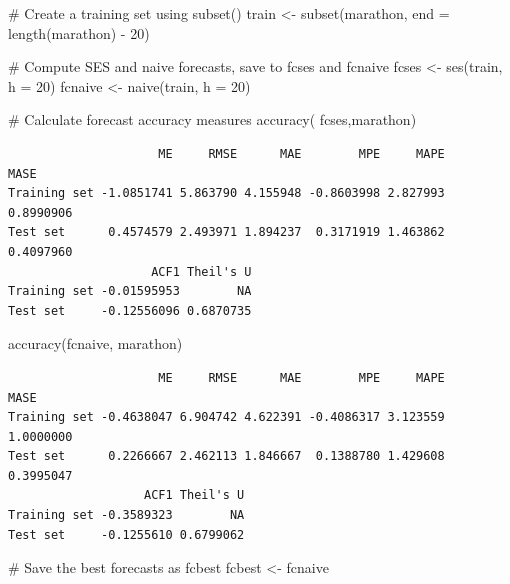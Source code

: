 \documentclass[
  letterpaper,
  DIV=11,
  numbers=noendperiod]{scrartcl}
\newenvironment{Shaded}{\begin{snugshade}}{\end{snugshade}}
\newcommand{\AttributeTok}[1]{\textcolor[rgb]{0.40,0.45,0.13}{#1}}
\newcommand{\CommentTok}[1]{\textcolor[rgb]{0.37,0.37,0.37}{#1}}
\newcommand{\DecValTok}[1]{\textcolor[rgb]{0.68,0.00,0.00}{#1}}
\newcommand{\FunctionTok}[1]{\textcolor[rgb]{0.28,0.35,0.67}{#1}}
\newcommand{\NormalTok}[1]{\textcolor[rgb]{0.00,0.23,0.31}{#1}}
\newcommand{\OtherTok}[1]{\textcolor[rgb]{0.00,0.23,0.31}{#1}}
\newcommand{\SpecialCharTok}[1]{\textcolor[rgb]{0.37,0.37,0.37}{#1}}
\begin{document}
\begin{Shaded}
\begin{Highlighting}[]
\CommentTok{\# Create a training set using subset()}
\NormalTok{train }\OtherTok{\textless{}{-}} \FunctionTok{subset}\NormalTok{(marathon, }\AttributeTok{end =} \FunctionTok{length}\NormalTok{(marathon) }\SpecialCharTok{{-}} \DecValTok{20}\NormalTok{)}

\CommentTok{\# Compute SES and naive forecasts, save to fcses and fcnaive}
\NormalTok{fcses }\OtherTok{\textless{}{-}} \FunctionTok{ses}\NormalTok{(train, }\AttributeTok{h =} \DecValTok{20}\NormalTok{)}
\NormalTok{fcnaive }\OtherTok{\textless{}{-}} \FunctionTok{naive}\NormalTok{(train, }\AttributeTok{h =} \DecValTok{20}\NormalTok{)}

\CommentTok{\# Calculate forecast accuracy measures}
\FunctionTok{accuracy}\NormalTok{( fcses,marathon)}
\end{Highlighting}
\end{Shaded}

\begin{verbatim}
                     ME     RMSE      MAE        MPE     MAPE      MASE
Training set -1.0851741 5.863790 4.155948 -0.8603998 2.827993 0.8990906
Test set      0.4574579 2.493971 1.894237  0.3171919 1.463862 0.4097960
                    ACF1 Theil's U
Training set -0.01595953        NA
Test set     -0.12556096 0.6870735
\end{verbatim}

\begin{Shaded}
\begin{Highlighting}[]
\FunctionTok{accuracy}\NormalTok{(fcnaive, marathon)}
\end{Highlighting}
\end{Shaded}

\begin{verbatim}
                     ME     RMSE      MAE        MPE     MAPE      MASE
Training set -0.4638047 6.904742 4.622391 -0.4086317 3.123559 1.0000000
Test set      0.2266667 2.462113 1.846667  0.1388780 1.429608 0.3995047
                   ACF1 Theil's U
Training set -0.3589323        NA
Test set     -0.1255610 0.6799062
\end{verbatim}

\begin{Shaded}
\begin{Highlighting}[]
\CommentTok{\# Save the best forecasts as fcbest}
\NormalTok{fcbest }\OtherTok{\textless{}{-}}\NormalTok{ fcnaive}
\end{Highlighting}
\end{Shaded}
\end{document}
